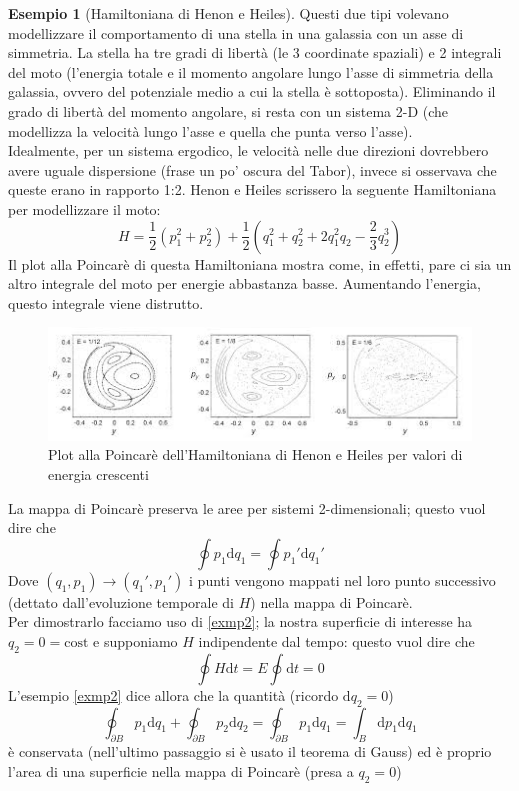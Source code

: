 \documentclass[a4paper,12pt]{article}
\theoremstyle{plain}
\theoremstyle{definition}
\newtheorem{exmp}{Esempio}[section]
\newcommand{\f}[2]{\frac{#1}{#2}}
\renewcommand{\d}{\text{d}}
\theoremstyle{remark}
\begin{document}
\begin{exmp}[Hamiltoniana di Henon e Heiles]\label{Henon}
Questi due tipi volevano modellizzare il comportamento di una stella in una galassia con un asse di simmetria. La stella ha tre gradi di libertà (le 3 coordinate spaziali) e 2 integrali del moto (l'energia totale e il momento angolare lungo l'asse di simmetria della galassia, ovvero del potenziale medio a cui la stella è sottoposta). Eliminando il grado di libertà del momento angolare, si resta con un sistema 2-D (che modellizza la velocità lungo l'asse e quella che punta verso l'asse). \\Idealmente, per un sistema ergodico, le velocità nelle due direzioni dovrebbero avere uguale dispersione (frase un po' oscura del Tabor), invece si osservava che queste erano in rapporto 1:2. Henon e Heiles scrissero la seguente Hamiltoniana per modellizzare il moto:
\[H=\f{1}{2}(p_1^2+p_2^2)+\f{1}{2}	(q_1^2+q_2^2+2q_1^2q_2-\f{2}{3}q_2^3)		\]
Il plot alla Poincarè di questa Hamiltoniana mostra come, in effetti, pare ci sia un altro integrale del moto per energie abbastanza basse. Aumentando l'energia, questo integrale viene distrutto.
\begin{figure}[h]
	\centering
	\includegraphics[scale=0.8]{images.jpg}
	\caption{Plot alla Poincarè dell'Hamiltoniana di Henon e Heiles per valori di energia crescenti}
\end{figure}
\end{exmp}
La mappa di Poincarè preserva le aree per sistemi 2-dimensionali; questo vuol dire che
\[\oint p_1\d q_1=\oint p_1' \d q_1' 			\]
Dove $(q_1,p_1)\rightarrow(q_1',p_1')$ i punti vengono mappati nel loro punto successivo (dettato dall'evoluzione temporale di $H$) nella mappa di Poincarè.\\
Per dimostrarlo facciamo uso di \ref{exmp2}; la nostra superficie di interesse ha $q_2=0=\text{cost}$ e supponiamo $H$ indipendente dal tempo: questo vuol dire che 
\[\oint H\d t=E\oint \d t =0		\]
L'esempio \ref{exmp2} dice allora che la quantità (ricordo $\d q_2=0$)
\[\oint_{\partial B}	p_1\d q_1+\oint_{\partial B} p_2\d q_2=\oint_{\partial B} p_1\d q_1=\int_B \d p_1 \d q_1	\]
è conservata (nell'ultimo passaggio si è usato il teorema di Gauss) ed è proprio l'area di una superficie nella mappa di Poincarè (presa a $q_2=0$)
\end{document}
